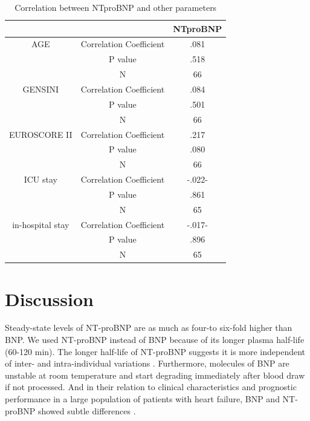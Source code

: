 \documentclass[14pt,a4paper,onecolumn]{extarticle}
\begin{document}
\begin{table}[]
\centering
\caption{Correlation between NTproBNP and other parameters}
\label{Result_correl_parameters}
\begin{tabular}{ccc}
    \hline
                 &                         & NTproBNP \\\hline
AGE              & Correlation Coefficient & .081     \\
                 & P value                 & .518     \\
                 & N                       & 66       \\
GENSINI          & Correlation Coefficient & .084     \\
                 & P value                 & .501     \\
                 & N                       & 66       \\
EUROSCORE II     & Correlation Coefficient & .217     \\
                 & P value                 & .080     \\
                 & N                       & 66       \\
ICU stay         & Correlation Coefficient & -.022-   \\
                 & P value                 & .861     \\
                 & N                       & 65       \\
in-hospital stay & Correlation Coefficient & -.017-   \\
                 & P value                 & .896     \\
                 & N                       & 65

\end{tabular}
\end{table}

\section{Discussion}

Steady-state levels of NT-proBNP are as much as four-to six-fold higher than BNP. We used NT-proBNP instead of BNP because of its longer plasma half-life (60-120 min). The longer half-life of NT-proBNP suggests it is more independent of inter- and intra-individual variations \citep{Clerico2006}. Furthermore, molecules of BNP are unstable at room temperature and start degrading immediately after blood draw if not processed. And in their relation to clinical characteristics and prognostic performance in a large population of patients with heart failure, BNP and NT-proBNP showed subtle differences \citep{Masson2006}.
\end{document}
